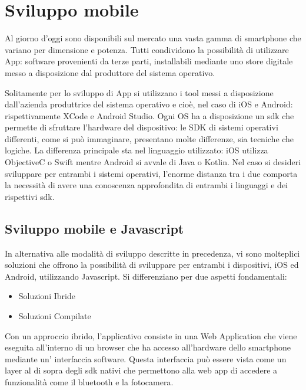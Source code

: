 \section{Sviluppo mobile}\vspace{5mm}

Al giorno d'oggi sono disponibili sul mercato una vasta gamma di smartphone che variano per dimensione e potenza. Tutti condividono la possibilità di utilizzare App: software provenienti da terze parti, installabili mediante uno store digitale messo a disposizione dal produttore del sistema operativo.\vspace{5mm}

Solitamente per lo sviluppo di App si utilizzano i tool messi a disposizione dall'azienda produttrice del sistema operativo e cioè, nel caso di iOS e Android: rispettivamente XCode e Android Studio. Ogni OS ha a disposizione un sdk che permette di sfruttare l'hardware del dispositivo: le SDK di sistemi operativi differenti, come si può immaginare, presentano molte differenze, sia tecniche che logiche. La differenza principale sta nel linguaggio utilizzato: iOS utilizza ObjectiveC o Swift mentre Android si avvale di Java o Kotlin. Nel caso si desideri sviluppare per entrambi i sistemi operativi, l'enorme distanza tra i due comporta la necessità di avere una conoscenza approfondita di entrambi i linguaggi e dei rispettivi sdk.\vspace{5mm}

\subsection{Sviluppo mobile e Javascript}\vspace{5mm}

In alternativa alle modalità di sviluppo descritte in precedenza, vi sono molteplici soluzioni che offrono la possibilità di sviluppare per entrambi i dispositivi, iOS ed Android, utilizzando Javascript. Si differenziano per due aspetti fondamentali:
\begin{itemize}
\item Soluzioni Ibride
\item Soluzioni Compilate
\end{itemize}

Con un approccio ibrido, l'applicativo consiste in una Web Application che viene eseguita all'interno di un browser che ha accesso all'hardware dello smartphone mediante un' interfaccia software. Questa interfaccia può essere vista come un layer al di sopra degli sdk nativi che permettono alla web app di accedere a funzionalità come il bluetooth e la fotocamera.\vspace{5mm}

